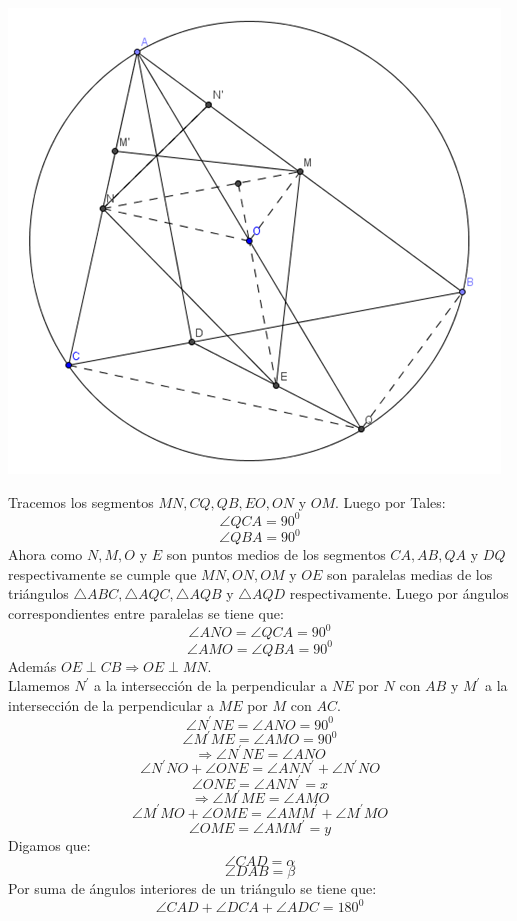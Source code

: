 \documentclass{book}
\begin{document}
\begin{enumerate}
\begin{center}
            \includegraphics[scale=1]{imagenes/Geometria/19.png}
        \end{center}
        Tracemos los segmentos $MN,CQ,QB,EO,ON$ y $OM$. Luego por Tales:
        $$\angle QCA=90^0$$
        $$\angle QBA=90^0$$
        Ahora como $N,M,O$ y $E$ son puntos medios de los segmentos $CA,AB,QA$ y $DQ$ respectivamente se cumple que $MN,ON,OM$ y $OE$ son paralelas medias de los triángulos $\triangle ABC,\triangle AQC,\triangle AQB$ y $\triangle AQD$ respectivamente. Luego por ángulos correspondientes entre paralelas se tiene que:
        $$\angle ANO=\angle QCA=90^0$$
        $$\angle AMO=\angle QBA=90^0$$
        Además $OE\perp CB\Rightarrow OE\perp MN$.\\
        Llamemos $N^{'}$ a la intersección de la perpendicular a $NE$ por $N$ con $AB$ y  $M^{'}$ a la intersección de la perpendicular a $ME$ por $M$ con $AC$.
        $$\angle N^{'} NE=\angle ANO=90^0$$
        $$\angle M^{'} ME=\angle AMO=90^0$$
        $$\Rightarrow\angle N^{'}NE=\angle ANO$$
        $$\angle N^{'} NO+\angle ONE=\angle ANN^{'}+\angle N^{'} NO$$
        $$\angle ONE=\angle ANN^{'}=x$$
        $$\Rightarrow\angle M^{'} ME=\angle AMO$$
        $$\angle M^{'} MO+\angle OME=\angle AMM^{'}+\angle M^{'} MO$$
        $$\angle OME=\angle AMM^{'}=y$$
        Digamos que:
        $$\angle CAD=\alpha$$
        $$\angle DAB=\beta$$
        Por suma de ángulos interiores de un triángulo se tiene que:
        $$\angle CAD+\angle DCA+\angle ADC=180^0$$

\end{enumerate}
\end{document}
